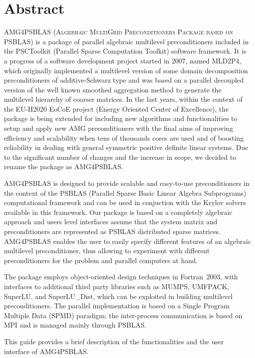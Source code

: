 \section*{Abstract}
\ifpdf
{}
\fi

\textsc{AMG4PSBLAS (Algebraic MultiGrid Preconditioners Package
based on PSBLAS}) is a package of parallel algebraic multilevel preconditioners included in the PSCToolkit (Parallel Sparse Computation Toolkit) software framework.
It is a progress of a software development project started in 2007, named MLD2P4, which originally implemented a 
multilevel version of some domain decomposition preconditioners of additive-Schwarz type and was based on a parallel decoupled version of the well known smoothed
aggregation method to generate the multilevel hierarchy of coarser matrices. 
In the last years, within the context of the EU-H2020 EoCoE project (Energy Oriented Center of Excellence), the package is being extended for including new algorithms and 
functionalities to setup and apply new AMG preconditioners with the final aims of improving efficiency and scalability when tens of thousands cores are
used and of boosting reliability in dealing with general symmetric positive definite linear systems. 
Due to the significant number of changes and the increase in scope, we decided to rename the package as AMG4PSBLAS.

AMG4PSBLAS is designed to provide scalable and easy-to-use preconditioners
in the context of the PSBLAS (Parallel Sparse Basic Linear Algebra Subprograms)
computational framework and can be used in conjuction with the Krylov solvers
available in this framework.
Our package is based on a completely algebraic approach and users level interfaces
assume that the system matrix and preconditioners are represented as PSBLAS
distributed sparse matrices.
AMG4PSBLAS enables the user to easily specify different
features of an algebraic multilevel preconditioner, thus allowing to experiment
with different preconditioners for the problem and parallel computers at hand.

The package employs object-oriented design techniques in
Fortran~2003, with interfaces to additional third party libraries
such as MUMPS, UMFPACK, SuperLU, and SuperLU\_Dist, which
can be exploited in building multilevel preconditioners. The parallel
implementation is based on a Single Program Multiple Data (SPMD)
paradigm; the inter-process communication is based on MPI and
is managed mainly through PSBLAS.

This guide provides a brief description of the functionalities and
the user interface of AMG4PSBLAS. 

